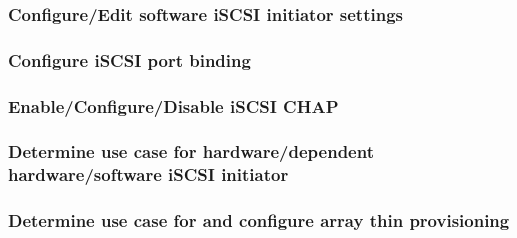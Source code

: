 \subsubsection{Configure/Edit software iSCSI initiator settings}

\subsubsection{Configure iSCSI port binding}

\subsubsection{Enable/Configure/Disable iSCSI CHAP}

\subsubsection{Determine use case for hardware/dependent hardware/software iSCSI initiator}

\subsubsection{Determine use case for and configure array thin provisioning}
